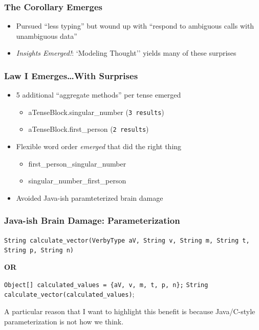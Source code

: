 \documentclass[slidestop,compress,mathserif]{beamer}
\begin{document}
\begin{frame}
	\frametitle{The Corollary Emerges}
	\begin{itemize}
		\item 	Pursued ``less typing'' but wound up with ``respond to ambiguous calls with unambiguous data''
		\pause
		\item  \emph{Insights Emerged!}:  `Modeling Thought'' yields many of these surprises
	\end{itemize}
\end{frame}


\begin{frame}
	\frametitle{Law I Emerges{\ldots}With Surprises}
	\begin{itemize}
		\item 5 additional ``aggregate methods'' per tense emerged
		\begin{itemize}
			\item {aTenseBlock}.singular\_number (\texttt{3 results})
			\item {aTenseBlock}.first\_person (\texttt{2 results})	
		\end{itemize}
		
		\pause
		
		\item Flexible word order \emph{emerged} that did the right thing
		\begin{itemize}
			\item first\_person\_singular\_number
			\item singular\_number\_first\_person
		\end{itemize}
		
		\pause
		
		\item Avoided Java-ish paramteterized brain damage
	\end{itemize}
\end{frame}


\begin{frame}
	\frametitle{Java-ish Brain Damage:  Parameterization}	
 	\texttt{String calculate\_vector(VerbyType aV, String v, String m, String t, String p, String n)}
	\vskip 0.5cm

	\begin{center}
		\textbf{OR}
	\end{center}

	\vskip 0.5cm	
	\texttt{Object[] calculated\_values = \{aV, v, m, t, p, n\};} 
	\texttt{String calculate\_vector(calculated\_values)}; 	
\end{frame}
\note
{A particular reason that I want to highlight this benefit is because Java/C-style
parameterization is not how we think.
}
\end{document}
